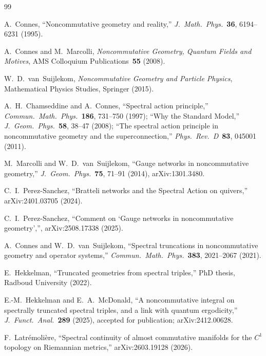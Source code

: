 \documentclass[11pt]{article}
\begin{document}
\begin{thebibliography}{99}

A.~Connes, ``Noncommutative geometry and reality,''
\textit{J.~Math.~Phys.}\ \textbf{36}, 6194--6231 (1995).

A.~Connes and M.~Marcolli, \textit{Noncommutative Geometry, Quantum
Fields and Motives}, AMS Colloquium Publications~\textbf{55} (2008).

W.~D.~van~Suijlekom, \textit{Noncommutative Geometry and Particle
Physics}, Mathematical Physics Studies, Springer (2015).

A.~H.~Chamseddine and A.~Connes,
``Spectral action principle,''
\textit{Commun.~Math.~Phys.}\ \textbf{186}, 731--750 (1997);
``Why the Standard Model,''
\textit{J.~Geom.~Phys.}\ \textbf{58}, 38--47 (2008);
``The spectral action principle in noncommutative geometry and the
superconnection,''
\textit{Phys.~Rev.~D}\ \textbf{83}, 045001 (2011).

M.~Marcolli and W.~D.~van~Suijlekom,
``Gauge networks in noncommutative geometry,''
\textit{J.~Geom.~Phys.}\ \textbf{75}, 71--91 (2014),
arXiv:1301.3480.

C.~I.~Perez-Sanchez,
``Bratteli networks and the Spectral Action on quivers,''
arXiv:2401.03705 (2024).

C.~I.~Perez-Sanchez,
``Comment on `Gauge networks in noncommutative geometry','',
arXiv:2508.17338 (2025).

A.~Connes and W.~D.~van~Suijlekom,
``Spectral truncations in noncommutative geometry and operator
systems,''
\textit{Commun.~Math.~Phys.}\ \textbf{383}, 2021--2067 (2021).

E.~Hekkelman,
``Truncated geometries from spectral triples,''
PhD thesis, Radboud University (2022).

E.-M.~Hekkelman and E.~A.~McDonald,
``A noncommutative integral on spectrally truncated spectral triples,
and a link with quantum ergodicity,''
\textit{J.~Funct.~Anal.}\ \textbf{289} (2025), accepted for
publication; arXiv:2412.00628.

F.~Latr\'emoli\`ere,
``Spectral continuity of almost commutative manifolds for the
$C^1$ topology on Riemannian metrics,''
arXiv:2603.19128 (2026).


\end{thebibliography}
\end{document}
